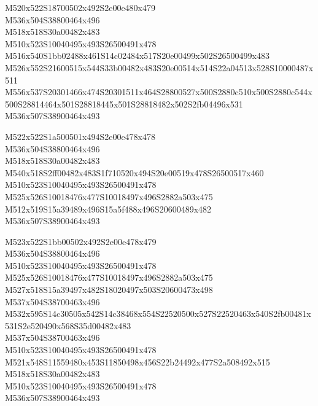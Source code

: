 \documentclass{article}
\begin{document}
\begin{multicols}{5}
\begin{center}

M520x522S18700502x492S2e00e480x479 %
\\M536x504S38800464x496 %
\\M518x518S30a00482x483 %
\\M510x523S10040495x493S26500491x478 %
\\M516x540S1bb02488x461S14c02484x517S20e00499x502S26500499x483 %
\\M526x552S21600515x544S33b00482x483S20e00514x514S22a04513x528S10000487x511 %
\\M556x537S20301466x474S20301511x464S28800527x500S2880c510x500S2880c544x500S28814464x501S28818445x501S28818482x502S2fb04496x531 %
\\M536x507S38900464x493 %
\vfil
\columnbreak

M522x522S1a500501x494S2e00e478x478 %
\\M536x504S38800464x496 %
\\M518x518S30a00482x483 %
\\M540x518S2ff00482x483S1f710520x494S20e00519x478S26500517x460 %
\\M510x523S10040495x493S26500491x478 %
\\M525x526S10018476x477S10018497x496S2882a503x475 %
\\M512x519S15a39489x496S15a5f488x496S20600489x482 %
\\M536x507S38900464x493 %
\vfil
\columnbreak

M523x522S1bb00502x492S2e00e478x479 %
\\M536x504S38800464x496 %
\\M510x523S10040495x493S26500491x478 %
\\M525x526S10018476x477S10018497x496S2882a503x475 %
\\M527x518S15a39497x482S18020497x503S20600473x498 %
\\M537x504S38700463x496 %
\\M532x595S14c30505x542S14c38468x554S22520500x527S22520463x540S2fb00481x531S2e520490x568S35d00482x483 %
\\M537x504S38700463x496 %
\\M510x523S10040495x493S26500491x478 %
\\M521x548S11559480x453S11850498x456S22b24492x477S2a508492x515 %
\\M518x518S30a00482x483 %
\\M510x523S10040495x493S26500491x478 %
\\M536x507S38900464x493 %
\vfil
\columnbreak


\end{center}
\end{multicols}
\end{document}
